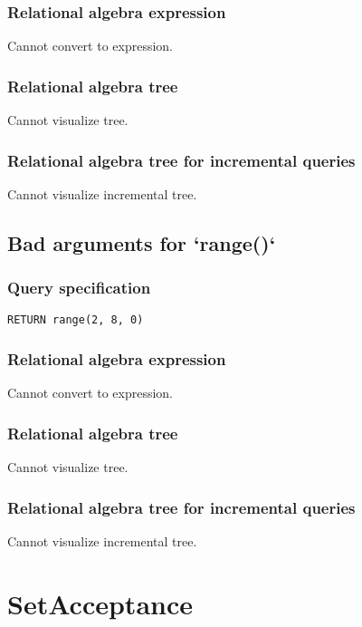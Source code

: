 \subsubsection*{Relational algebra expression}

Cannot convert to expression.

\subsubsection*{Relational algebra tree}

Cannot visualize tree.

\subsubsection*{Relational algebra tree for incremental queries}

Cannot visualize incremental tree.

\subsection{Bad arguments for `range()`}

\subsubsection*{Query specification}

\begin{lstlisting}
RETURN range(2, 8, 0)
\end{lstlisting}

\subsubsection*{Relational algebra expression}

Cannot convert to expression.

\subsubsection*{Relational algebra tree}

Cannot visualize tree.

\subsubsection*{Relational algebra tree for incremental queries}

Cannot visualize incremental tree.

\section{SetAcceptance}

